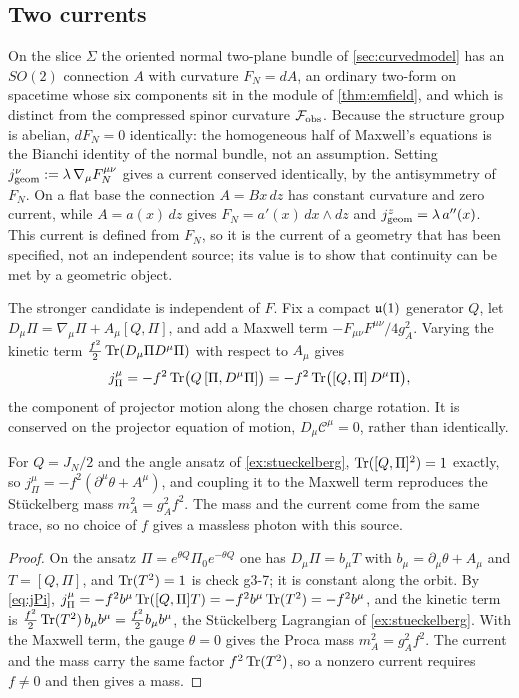 \subsection{Two currents}

On the slice $\Sigma$ the oriented normal two-plane bundle of \cref{sec:curvedmodel} has an $SO(2)$ connection $A$ with curvature $F_N=dA$, an ordinary two-form
on spacetime whose six components sit in the module of \cref{thm:emfield}, and which is distinct from the compressed spinor curvature $\mathcal F_{\rm obs}$.
Because the structure group is abelian, $dF_N=0$ identically: the homogeneous half of Maxwell's equations is the Bianchi identity of the normal bundle, not an
assumption. Setting $j^\nu_{\rm geom}:=\lambda\,\nabla_\mu F_N^{\mu\nu}$ gives a current conserved identically, by the antisymmetry of $F_N$. On a flat base the
connection $A=Bx\,dz$ has constant curvature and zero current, while $A=a(x)\,dz$ gives $F_N=a'(x)\,dx\wedge dz$ and $j^z_{\rm geom}=\lambda\,a''(x)$. This current is
defined from $F_N$, so it is the current of a geometry that has been specified, not an independent source; its value is to show that continuity can be met by a
geometric object.

The stronger candidate is independent of $F$. Fix a compact $\mathfrak{u}(1)$ generator $Q$, let $D_\mu\Pi=\nabla_\mu\Pi+A_\mu[Q,\Pi]$, and add a Maxwell term
$-F_{\mu\nu}F^{\mu\nu}/4g_A^2$. Varying the kinetic term $\tfrac{f^2}2\operatorname{Tr}(D_\mu\Pi D^\mu\Pi)$ with respect to $A_\mu$ gives
\begin{equation}
\label{eq:jPi}
j^\mu_\Pi=-f^2\operatorname{Tr}\bigl(Q\,[\Pi,D^\mu\Pi]\bigr)=-f^2\operatorname{Tr}\bigl([Q,\Pi]\,D^\mu\Pi\bigr),
\end{equation}
the component of projector motion along the chosen charge rotation. It is conserved on the projector equation of motion, $D_\mu\mathcal C^\mu=0$, rather than
identically.

\begin{theorem}
\label{thm:photonmass}
For $Q=J_N/2$ and the angle ansatz of \cref{ex:stueckelberg}, $\operatorname{Tr}([Q,\Pi]^2)=1$ exactly, so $j^\mu_\Pi=-f^2(\partial^\mu\theta+A^\mu)$, and coupling it to the Maxwell term
reproduces the St\"uckelberg mass $m_A^2=g_A^2f^2$. The mass and the current come from the same trace, so no choice of $f$ gives a massless photon with this source.
\end{theorem}

\begin{proof}
On the ansatz $\Pi=e^{\theta Q}\Pi_0e^{-\theta Q}$ one has $D_\mu\Pi=b_\mu T$ with $b_\mu=\partial_\mu\theta+A_\mu$ and $T=[Q,\Pi]$, and $\operatorname{Tr}(T^2)=1$ is
check g3-7; it is constant along the orbit. By \eqref{eq:jPi}, $j^\mu_\Pi=-f^2b^\mu\operatorname{Tr}([Q,\Pi]T)=-f^2b^\mu\operatorname{Tr}(T^2)=-f^2b^\mu$, and the kinetic term is
$\tfrac{f^2}2\operatorname{Tr}(T^2)\,b_\mu b^\mu=\tfrac{f^2}2b_\mu b^\mu$, the St\"uckelberg Lagrangian of \cref{ex:stueckelberg}. With the Maxwell term, the gauge $\theta=0$
gives the Proca mass $m_A^2=g_A^2f^2$. The current and the mass carry the same factor $f^2\operatorname{Tr}(T^2)$, so a nonzero current requires $f\neq0$ and then gives
a mass.
\end{proof}

